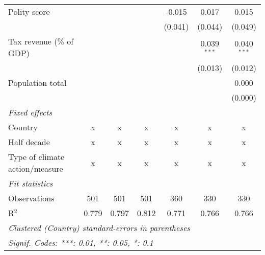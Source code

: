\begin{tabular}{lcccccc}
   Polity score                                            &         &                &                & -0.015         & 0.017          & 0.015\\   
                                                           &         &                &                & (0.041)        & (0.044)        & (0.049)\\   
   Tax revenue (\% of GDP)                                 &         &                &                &                & 0.039$^{***}$  & 0.040$^{***}$\\   
                                                           &         &                &                &                & (0.013)        & (0.012)\\   
   Population total                                        &         &                &                &                &                & 0.000\\   
                                                           &         &                &                &                &                & (0.000)\\   
   \emph{Fixed effects}\\
   Country                                                 & x       & x              & x              & x              & x              & x\\  
   Half decade                                             & x       & x              & x              & x              & x              & x\\  
   Type of climate action/measure                          & x       & x              & x              & x              & x              & x\\  
   \midrule \emph{Fit statistics}\\
   Observations                                            & 501     & 501            & 501            & 360            & 330            & 330\\  
   R$^2$                                                   & 0.779   & 0.797          & 0.812          & 0.771          & 0.766          & 0.766\\  
   \midrule
   \multicolumn{7}{l}{\emph{Clustered (Country) standard-errors in parentheses}}\\
   \multicolumn{7}{l}{\emph{Signif. Codes: ***: 0.01, **: 0.05, *: 0.1}}\\
\end{tabular}
\par\endgroup


